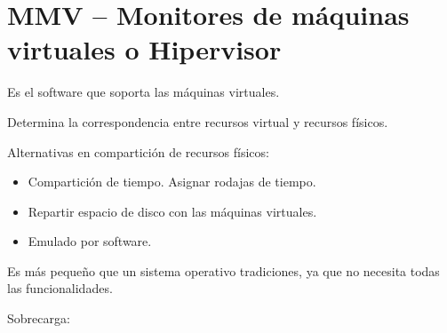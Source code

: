 \documentclass[12pt, twoside, openright]{report} %
\begin{document}
\section{MMV -- Monitores de máquinas virtuales o Hipervisor}
\begin{figure}[H]
	{\def\svgwidth{.7\textwidth}
		}
\end{figure}


Es el software que soporta las máquinas virtuales.


Determina la correspondencia entre recursos virtual y recursos
físicos.



Alternativas en compartición de recursos físicos:

\begin{itemize}

	\item Compartición de tiempo. Asignar rodajas de tiempo.
	\item Repartir espacio de disco con las máquinas virtuales.
	\item Emulado por software.
\end{itemize}

Es más pequeño que un sistema operativo tradiciones, ya que no
necesita todas las funcionalidades.

Sobrecarga:
\end{document}
